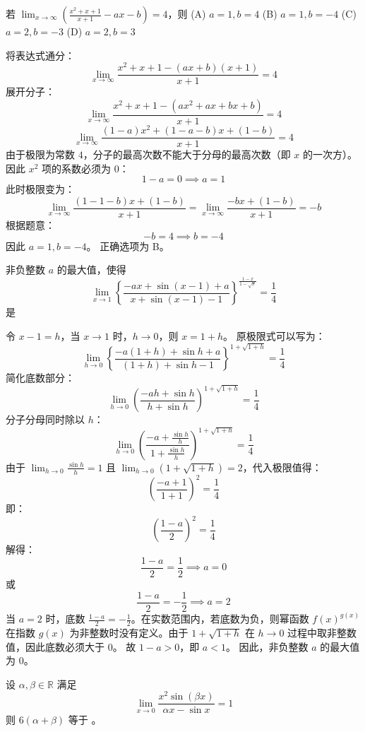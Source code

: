 \begin{questions}
    \question 若 $\lim_{x \to \infty} \left( \frac{x^2 + x + 1}{x + 1} - ax - b \right) = 4$，则
(A) $a = 1, b = 4$
(B) $a = 1, b = -4$
(C) $a = 2, b = -3$
(D) $a = 2, b = 3$

\begin{solution}
将表达式通分：
\[
\lim_{x \to \infty} \frac{x^2 + x + 1 - (ax + b)(x + 1)}{x + 1} = 4
\]
展开分子：
\[
\lim_{x \to \infty} \frac{x^2 + x + 1 - (ax^2 + ax + bx + b)}{x + 1} = 4
\]
\[
\lim_{x \to \infty} \frac{(1 - a)x^2 + (1 - a - b)x + (1 - b)}{x + 1} = 4
\]
由于极限为常数 $4$，分子的最高次数不能大于分母的最高次数（即 $x$ 的一次方）。
因此 $x^2$ 项的系数必须为 $0$：
\[
1 - a = 0 \implies a = 1
\]
此时极限变为：
\[
\lim_{x \to \infty} \frac{(1 - 1 - b)x + (1 - b)}{x + 1} = \lim_{x \to \infty} \frac{-bx + (1 - b)}{x + 1} = -b
\]
根据题意：
\[
-b = 4 \implies b = -4
\]
因此 $a = 1, b = -4$。
正确选项为 B。
\end{solution}

    \question 非负整数 $a$ 的最大值，使得
\[
\lim_{x \to 1} \left\{ \frac{-ax + \sin(x-1) + a}{x + \sin(x-1) - 1} \right\}^{\frac{1-x}{1-\sqrt{x}}} = \frac{1}{4}
\]
是

\begin{solution}
令 $x-1 = h$，当 $x \to 1$ 时，$h \to 0$，则 $x = 1+h$。
原极限式可以写为：
\[
\lim_{h \to 0} \left\{ \frac{-a(1+h) + \sin h + a}{(1+h) + \sin h - 1} \right\}^{1+\sqrt{1+h}} = \frac{1}{4}
\]
简化底数部分：
\[
\lim_{h \to 0} \left( \frac{-ah + \sin h}{h + \sin h} \right)^{1+\sqrt{1+h}} = \frac{1}{4}
\]
分子分母同时除以 $h$：
\[
\lim_{h \to 0} \left( \frac{-a + \frac{\sin h}{h}}{1 + \frac{\sin h}{h}} \right)^{1+\sqrt{1+h}} = \frac{1}{4}
\]
由于 $\lim_{h \to 0} \frac{\sin h}{h} = 1$ 且 $\lim_{h \to 0} (1+\sqrt{1+h}) = 2$，代入极限值得：
\[
\left( \frac{-a + 1}{1 + 1} \right)^{2} = \frac{1}{4}
\]
即：
\[
\left( \frac{1-a}{2} \right)^{2} = \frac{1}{4}
\]
解得：
\[
\frac{1-a}{2} = \frac{1}{2} \implies a = 0
\]
或
\[
\frac{1-a}{2} = -\frac{1}{2} \implies a = 2
\]
当 $a=2$ 时，底数 $\frac{1-a}{2} = -\frac{1}{2}$。在实数范围内，若底数为负，则幂函数 $f(x)^{g(x)}$ 在指数 $g(x)$ 为非整数时没有定义。由于 $1+\sqrt{1+h}$ 在 $h \to 0$ 过程中取非整数值，因此底数必须大于 $0$。
故 $1-a > 0$，即 $a < 1$。
因此，非负整数 $a$ 的最大值为 $0$。
\end{solution}

    \question 设 $\alpha, \beta \in \mathbb{R}$ 满足
\[
\lim_{x \to 0} \frac{x^2 \sin(\beta x)}{\alpha x - \sin x} = 1
\]
则 $6(\alpha + \beta)$ 等于 \underline{\hspace{1cm}}。


\end{questions}
